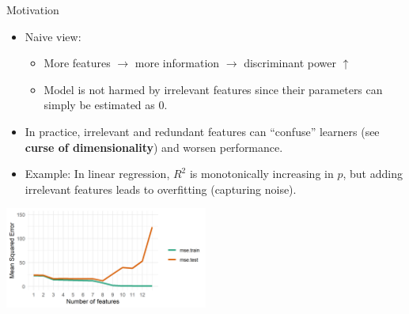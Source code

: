 \documentclass[11pt,compress,t,notes=noshow, xcolor=table]{beamer}
\begin{document}
  \begin{vbframe}{Motivation}
    \begin{itemize}
    \setlength{\itemsep}{0.8em}
      \item Naive view:
        \begin{itemize}
          \item More features $\rightarrow$ more information $\rightarrow$ discriminant power $\uparrow$
          \item Model is not harmed by irrelevant features since their parameters can simply be estimated as 0.
        \end{itemize}
     \item In practice, irrelevant and redundant features can \enquote{confuse} learners (see \textbf{curse of dimensionality}) and worsen performance.
     \item Example: In linear regression, $R^2$ is monotonically increasing in $p$, but adding irrelevant features leads to overfitting (capturing noise). %
  \end{itemize}

  \begin{center}
     \includegraphics[width = 0.5\textwidth]{figure/avoid_overfitting_02.png}\\
    \end{center}

  \framebreak


\end{vbframe}
\end{document}
